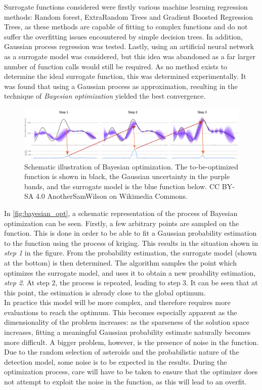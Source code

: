 Surrogate functions considered were firstly various machine learning regression methods: Random forest, ExtraRandom Trees and Gradient Boosted Regression Trees, as these methods are capable of fitting to complex functions and do not suffer the overfitting issues encountered by simple decision trees. In addition, Gaussian process regression was tested. Lastly, using an artificial neural network as a surrogate model was considered, but this idea was abandoned as a far larger number of function calls would still be required. As no method exists to determine the ideal surrogate function, this was determined experimentally. It was found that using a Gaussian process as approximation, resulting in the technique of \textit{Bayesian optimization} yielded the best convergence. \\

\begin{figure}[htbp]
 \centering
 \includegraphics[width=1.0\textwidth]{img/bayesian_opt.png}
 \caption{Schematic illustration of Bayesian optimization. The to-be-optimized function is shown in black, the Gaussian uncertainty in the purple bands, and the surrogate model is the blue function below. CC BY-SA 4.0 AnotherSamWilson on Wikimedia Commons.}
 \label{fig:bayesian_opt}
\end{figure}

In \autoref{fig:bayesian_opt}, a schematic representation of the process of Bayesian optimization can be seen. Firstly, a few arbitrary points are sampled on the function. This is done in order to be able to fit a Gaussian probability estimation to the function using the process of kriging. This results in the situation shown in \textit{step 1} in the figure. From the probability estimation, the surrogate model (shown at the bottom) is then determined. The algorithm samples the point which optimizes the surrogate model, and uses it to obtain a new proability estimation, \textit{step 2}. At step 2, the process is repeated, leading to step 3. It can be seen that at this point, the estimation is already close to the global optimum. \\

In practice this model will be more complex, and therefore requires more evaluations to reach the optimum. This becomes especially apparent as the dimensionality of the problem increases: as the sparseness of the solution space increases, fitting a meaningful Gaussian probability estimate naturally becomes more difficult. A bigger problem, however, is the presence of noise in the function. Due to the random selection of asteroids and the probabilistic nature of the detection model, some noise is to be expected in the results. During the optimization process, care will have to be taken to ensure that the optimizer does not attempt to exploit the noise in the function, as this will lead to an overfit. \\

